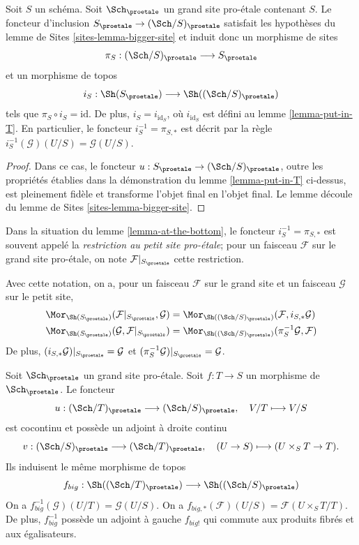 \begin{lemma}
\label{lemma-at-the-bottom}
Soit $S$ un schéma. Soit $\Sch_\proetale$ un grand site pro-\'etale
contenant $S$.
Le foncteur d'inclusion $S_\proetale \to (\Sch/S)_\proetale$
satisfait les hypothèses du lemme de Sites \ref{sites-lemma-bigger-site}
et induit donc un morphisme de sites
$$
\pi_S : (\Sch/S)_\proetale \longrightarrow S_\proetale
$$
et un morphisme de topos
$$
i_S : \Sh(S_\proetale) \longrightarrow \Sh((\Sch/S)_\proetale)
$$
tels que $\pi_S \circ i_S = \text{id}$. De plus, $i_S = i_{\text{id}_S}$,
où $i_{\text{id}_S}$ est défini au lemme \ref{lemma-put-in-T}. En particulier, le
foncteur $i_S^{-1} = \pi_{S, *}$ est décrit par la règle
$i_S^{-1}(\mathcal{G})(U/S) = \mathcal{G}(U/S)$.
\end{lemma}

\begin{proof}
Dans ce cas, le foncteur $u : S_\proetale \to (\Sch/S)_\proetale$,
outre les propriétés établies dans la démonstration du
lemme \ref{lemma-put-in-T} ci-dessus, est pleinement fidèle
et transforme l'objet final en l'objet final.
Le lemme découle du lemme de Sites \ref{sites-lemma-bigger-site}.
\end{proof}

\begin{definition}
\label{definition-restriction-small-proetale}
Dans la situation du
lemme \ref{lemma-at-the-bottom},
le foncteur $i_S^{-1} = \pi_{S, *}$ est souvent
appelé la {\it restriction au petit site pro-\'etale}; pour un faisceau
$\mathcal{F}$ sur le grand site pro-\'etale, on note
$\mathcal{F}|_{S_\proetale}$ cette restriction.
\end{definition}

\noindent
Avec cette notation, on a, pour un faisceau $\mathcal{F}$ sur le
grand site et un faisceau $\mathcal{G}$ sur le petit site,
\begin{align*}
\Mor_{\Sh(S_\proetale)}(\mathcal{F}|_{S_\proetale}, \mathcal{G})
& =
\Mor_{\Sh((\Sch/S)_\proetale)}(\mathcal{F},
i_{S, *}\mathcal{G}) \\
\Mor_{\Sh(S_\proetale)}(\mathcal{G}, \mathcal{F}|_{S_\proetale})
& =
\Mor_{\Sh((\Sch/S)_\proetale)}(\pi_S^{-1}\mathcal{G}, \mathcal{F})
\end{align*}
De plus, $(i_{S, *}\mathcal{G})|_{S_\proetale} = \mathcal{G}$
et $(\pi_S^{-1}\mathcal{G})|_{S_\proetale} = \mathcal{G}$.

\begin{lemma}
\label{lemma-morphism-big}
Soit $\Sch_\proetale$ un grand site pro-\'etale.
Soit $f : T \to S$ un morphisme de $\Sch_\proetale$.
Le foncteur
$$
u : (\Sch/T)_\proetale \longrightarrow (\Sch/S)_\proetale, \quad
V/T \longmapsto V/S
$$
est cocontinu et possède un adjoint à droite continu
$$
v : (\Sch/S)_\proetale \longrightarrow (\Sch/T)_\proetale, \quad
(U \to S) \longmapsto (U \times_S T \to T).
$$
Ils induisent le même morphisme de topos
$$
f_{big} :
\Sh((\Sch/T)_\proetale)
\longrightarrow
\Sh((\Sch/S)_\proetale)
$$
On a $f_{big}^{-1}(\mathcal{G})(U/T) = \mathcal{G}(U/S)$.
On a $f_{big, *}(\mathcal{F})(U/S) = \mathcal{F}(U \times_S T/T)$.
De plus, $f_{big}^{-1}$ possède un adjoint à gauche $f_{big!}$ qui commute aux
produits fibrés et aux égalisateurs.
\end{lemma}

